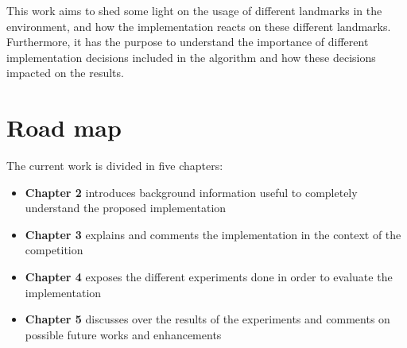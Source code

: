 This work aims to shed some light on the usage of different landmarks in the environment, and how the implementation reacts on these different landmarks. Furthermore, it has the purpose to understand the importance of different implementation decisions included in the algorithm and how these decisions impacted on the results.
\section*{Road map}
The current work is divided in five chapters:
\begin{itemize}
    \item{\textbf{Chapter 2} introduces background information useful to completely understand the proposed implementation}
    \item{\textbf{Chapter 3} explains and comments the implementation in the context of the competition}
    \item{\textbf{Chapter 4} exposes the different experiments done in order to evaluate the implementation}
    \item{\textbf{Chapter 5} discusses over the results of the experiments and comments on possible future works and enhancements}
\end{itemize}
